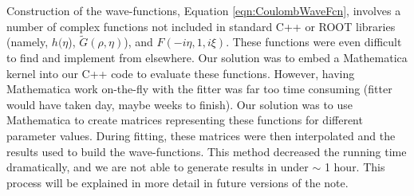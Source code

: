 \documentclass[../AnalysisNoteJBuxton.tex]{subfiles}
\begin{document}
Construction of the wave-functions, Equation \ref{eqn:CoulombWaveFcn}, involves a number of complex functions not included in standard C++ or ROOT libraries (namely, $h(\eta$), $\tilde{G}(\rho,\eta)$), and $F(-i\eta,1,i\xi)$.  These functions were even difficult to find and implement from elsewhere.  Our solution was to embed a Mathematica kernel into our C++ code to evaluate these functions.  However, having Mathematica work on-the-fly with the fitter was far too time consuming (fitter would have taken day, maybe weeks to finish).  Our solution was to use Mathematica to create matrices representing these functions for different parameter values.  During fitting, these matrices were then interpolated and the results used to build the wave-functions.  This method decreased the running time dramatically, and we are not able to generate results in under $\sim$ 1 hour. This process will be explained in more detail in future versions of the note.
\end{document}
